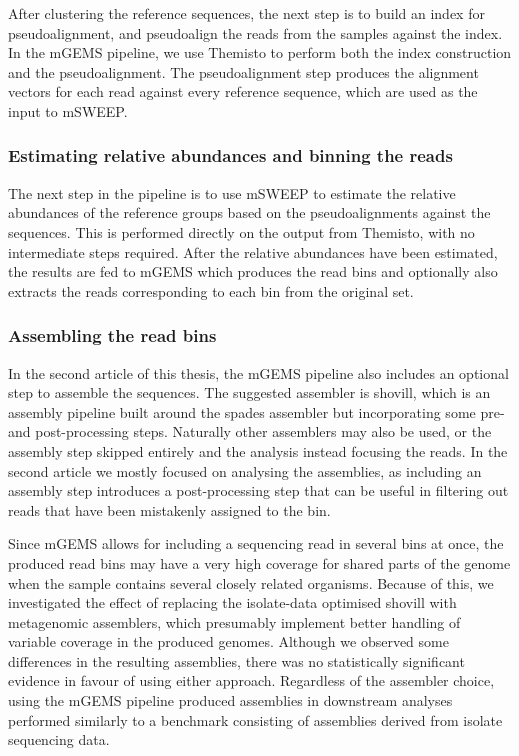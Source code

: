 \documentclass[officiallayout]{tktla}
\begin{document}
After clustering the reference sequences, the next step is to build an
index for pseudoalignment, and pseudoalign the reads from the samples
against the index. In the mGEMS pipeline, we use Themisto to perform
both the index construction and the pseudoalignment. The
pseudoalignment step produces the alignment vectors for each read
against every reference sequence, which are used as the input to
mSWEEP.

\subsubsection{Estimating relative abundances and binning the reads}

The next step in the pipeline is to use mSWEEP to estimate the
relative abundances of the reference groups based on the
pseudoalignments against the sequences. This is performed directly on
the output from Themisto, with no intermediate steps required. After
the relative abundances have been estimated, the results are fed to
mGEMS which produces the read bins and optionally also extracts the
reads corresponding to each bin from the original set.

\subsubsection{Assembling the read bins}

In the second article of this thesis, the mGEMS pipeline also includes
an optional step to assemble the sequences. The suggested assembler is
shovill, which is an assembly pipeline built around the spades
assembler but incorporating some pre- and post-processing
steps. Naturally other assemblers may also be used, or the assembly
step skipped entirely and the analysis instead focusing the reads. In
the second article we mostly focused on analysing the assemblies, as
including an assembly step introduces a post-processing step that can
be useful in filtering out reads that have been mistakenly assigned to
the bin.

Since mGEMS allows for including a sequencing read in several bins at
once, the produced read bins may have a very high coverage for shared
parts of the genome when the sample contains several closely related
organisms. Because of this, we investigated the effect of replacing
the isolate-data optimised shovill with metagenomic assemblers, which
presumably implement better handling of variable coverage in the
produced genomes. Although we observed some differences in the
resulting assemblies, there was no statistically significant evidence
in favour of using either approach. Regardless of the assembler
choice, using the mGEMS pipeline produced assemblies in downstream
analyses performed similarly to a benchmark consisting of assemblies
derived from isolate sequencing data.
\end{document}
